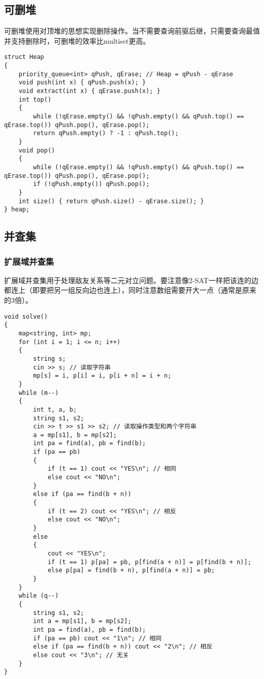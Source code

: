 \documentclass[a4paper, fontset=none]{ctexart}
\begin{document}
\subsection{可删堆}

可删堆使用对顶堆的思想实现删除操作。当不需要查询前驱后继，只需要查询最值并支持删除时，可删堆的效率比multiset更高。
\begin{verbatim}
struct Heap
{
    priority_queue<int> qPush, qErase; // Heap = qPush - qErase
    void push(int x) { qPush.push(x); }
    void extract(int x) { qErase.push(x); }
    int top()
    {
        while (!qErase.empty() && !qPush.empty() && qPush.top() == qErase.top()) qPush.pop(), qErase.pop();
        return qPush.empty() ? -1 : qPush.top();
    }
    void pop()
    {
        while (!qErase.empty() && !qPush.empty() && qPush.top() == qErase.top()) qPush.pop(), qErase.pop();
        if (!qPush.empty()) qPush.pop();
    }
    int size() { return qPush.size() - qErase.size(); }
} heap;
\end{verbatim}
\subsection{并查集}
\subsubsection{扩展域并查集}
扩展域并查集用于处理敌友关系等二元对立问题。要注意像2-SAT一样把该连的边都连上（即要把另一组反向边也连上），同时注意数组需要开大一点（通常是原来的3倍）。
\begin{verbatim}
void solve()
{
    map<string, int> mp;
    for (int i = 1; i <= n; i++)
    {
        string s;
        cin >> s; // 读取字符串
        mp[s] = i, p[i] = i, p[i + n] = i + n;
    }
    while (m--)
    {
        int t, a, b;
        string s1, s2;
        cin >> t >> s1 >> s2; // 读取操作类型和两个字符串
        a = mp[s1], b = mp[s2];
        int pa = find(a), pb = find(b);
        if (pa == pb)
        {
            if (t == 1) cout << "YES\n"; // 相同
            else cout << "NO\n";
        }
        else if (pa == find(b + n))
        {
            if (t == 2) cout << "YES\n"; // 相反
            else cout << "NO\n";
        }
        else
        {
            cout << "YES\n";
            if (t == 1) p[pa] = pb, p[find(a + n)] = p[find(b + n)];
            else p[pa] = find(b + n), p[find(a + n)] = pb;
        }
    }
    while (q--)
    {
        string s1, s2;
        int a = mp[s1], b = mp[s2];
        int pa = find(a), pb = find(b);
        if (pa == pb) cout << "1\n"; // 相同
        else if (pa == find(b + n)) cout << "2\n"; // 相反
        else cout << "3\n"; // 无关
    }
}
\end{verbatim}
\end{document}
